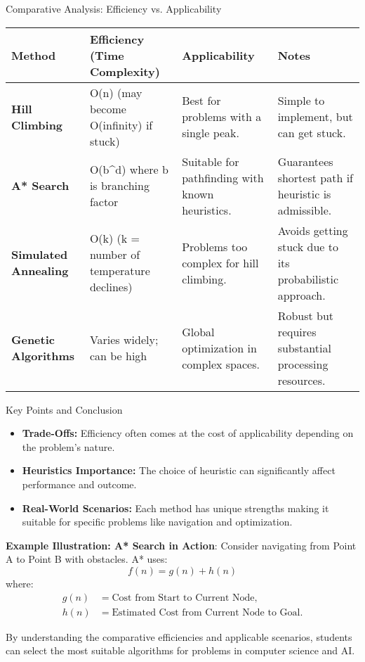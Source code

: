 \documentclass[aspectratio=169]{beamer}
\begin{document}
\begin{frame}[fragile]{Comparative Analysis: Efficiency vs. Applicability}
    \begin{table}[h!]
        \centering
        \begin{tabular}{|l|l|l|l|}
            \hline
            \textbf{Method} & \textbf{Efficiency (Time Complexity)} & \textbf{Applicability} & \textbf{Notes} \\ 
            \hline
            \textbf{Hill Climbing} & O(n) (may become O(infinity) if stuck) & Best for problems with a single peak. & Simple to implement, but can get stuck. \\ 
            \hline
            \textbf{A* Search} & O(b^d) where b is branching factor & Suitable for pathfinding with known heuristics. & Guarantees shortest path if heuristic is admissible. \\ 
            \hline
            \textbf{Simulated Annealing} & O(k) (k = number of temperature declines) & Problems too complex for hill climbing. & Avoids getting stuck due to its probabilistic approach. \\ 
            \hline
            \textbf{Genetic Algorithms} & Varies widely; can be high & Global optimization in complex spaces. & Robust but requires substantial processing resources. \\ 
            \hline
        \end{tabular}
    \end{table}
\end{frame}

\begin{frame}[fragile]{Key Points and Conclusion}
    \begin{itemize}
        \item \textbf{Trade-Offs:} Efficiency often comes at the cost of applicability depending on the problem's nature.
        \item \textbf{Heuristics Importance:} The choice of heuristic can significantly affect performance and outcome.
        \item \textbf{Real-World Scenarios:} Each method has unique strengths making it suitable for specific problems like navigation and optimization.
    \end{itemize}

    \textbf{Example Illustration: A* Search in Action}:
    Consider navigating from Point A to Point B with obstacles. A* uses:
    \begin{equation}
        f(n) = g(n) + h(n)
    \end{equation}
    where:
    \begin{align*}
        g(n) & = \text{Cost from Start to Current Node}, \\
        h(n) & = \text{Estimated Cost from Current Node to Goal}.
    \end{align*}
    
    By understanding the comparative efficiencies and applicable scenarios, students can select the most suitable algorithms for problems in computer science and AI.
\end{frame}
\end{document}
